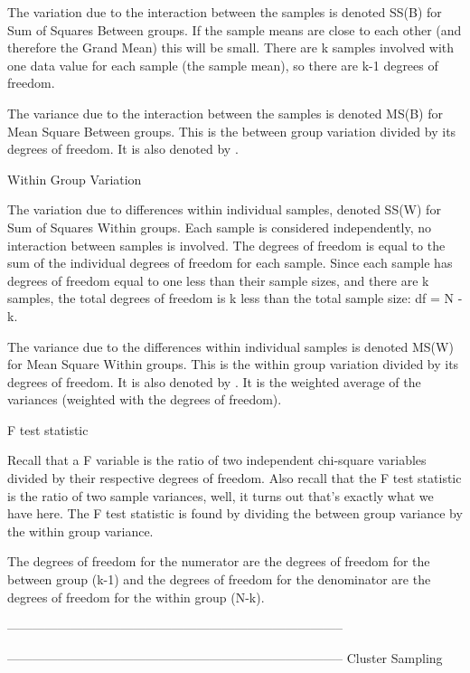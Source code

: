 The variation due to the interaction between the samples is denoted SS(B) for Sum of Squares Between groups. If the sample means are close to each other (and therefore the Grand Mean) this will be small. There are k samples involved with one data value for each sample (the sample mean), so there are k-1 degrees of freedom.

The variance due to the interaction between the samples is denoted MS(B) for Mean Square Between groups. This is the between group variation divided by its degrees of freedom. It is also denoted by .

Within Group Variation


The variation due to differences within individual samples, denoted SS(W) for Sum of Squares Within groups. Each sample is considered independently, no interaction between samples is involved. The degrees of freedom is equal to the sum of the individual degrees of freedom for each sample. Since each sample has degrees of freedom equal to one less than their sample sizes, and there are k samples, the total degrees of freedom is k less than the total sample size: df = N - k.


The variance due to the differences within individual samples is denoted MS(W) for Mean Square Within groups. This is the within group variation divided by its degrees of freedom. It is also denoted by . It is the weighted average of the variances (weighted with the degrees of freedom).

F test statistic


Recall that a F variable is the ratio of two independent chi-square variables divided by their respective degrees of freedom. Also recall that the F test statistic is the ratio of two sample variances, well, it turns out that's exactly what we have here. The F test statistic is found by dividing the between group variance by the within group variance. 


The degrees of freedom for the numerator are the degrees of freedom for the between group (k-1) and the degrees of freedom for the denominator are the degrees of freedom for the within group (N-k).







--------------------------------------------------------------------------------




--------------------------------------------------------------------------------
Cluster Sampling 

